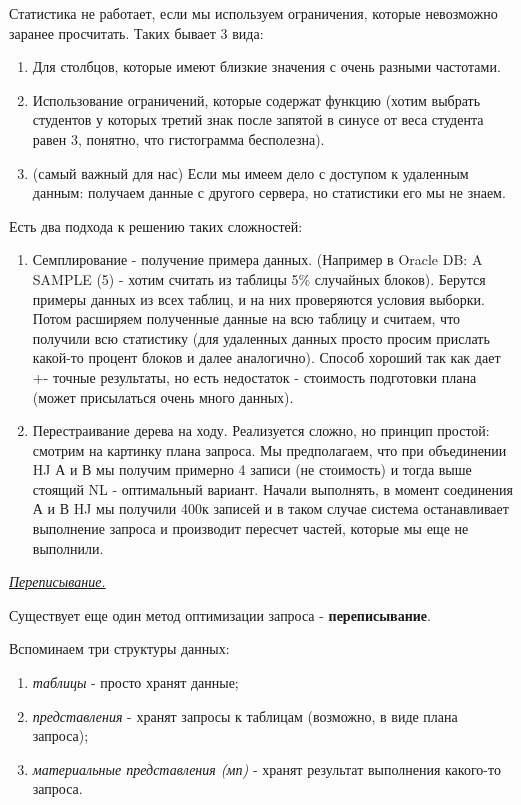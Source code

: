 \begin{itemize}
Статистика не работает, если мы используем ограничения, которые невозможно заранее просчитать. Таких бывает 3 вида: 
\begin{enumerate}
    \item Для столбцов, которые имеют близкие значения с очень разными частотами.
    \item Использование ограничений, которые содержат функцию (хотим выбрать студентов у которых третий знак после запятой в синусе от веса студента равен 3, понятно, что гистограмма бесполезна).
    \item (самый важный для нас) Если мы имеем дело с доступом к удаленным данным: получаем данные с другого сервера, но статистики его мы не знаем.
\end{enumerate}

Есть два подхода к решению таких сложностей: 

\begin{enumerate}
    \item Семплирование - получение примера данных. (Например в Oracle DB: A SAMPLE (5) - хотим считать из таблицы 5\% случайных блоков). Берутся примеры данных из всех таблиц, и на них проверяются условия выборки. Потом расширяем полученные данные на всю таблицу и считаем, что получили всю статистику (для удаленных данных просто просим прислать какой-то процент блоков и далее аналогично). Способ хороший так как дает +- точные результаты, но есть недостаток - стоимость подготовки плана (может присылаться очень много данных).
    \item Перестраивание дерева на ходу. Реализуется сложно, но принцип простой:  смотрим на картинку плана запроса. Мы предполагаем, что при объединении HJ А и В мы получим примерно 4 записи (не стоимость) и тогда выше стоящий NL - оптимальный вариант. Начали выполнять, в момент соединения А и В HJ мы получили 400к записей и в таком случае система останавливает выполнение запроса и производит пересчет частей, которые мы еще не выполнили.
\end{enumerate}
\end{itemize}


\begin{center}
\textit{\underline{Переписывание.}}
\end{center}

Существует еще один метод оптимизации запроса - \textbf{переписывание}. 

Вспоминаем три структуры данных: 

\begin{enumerate}
    \item \textit{таблицы} - просто хранят данные;
    \item  \textit{представления} - хранят запросы к таблицам (возможно, в виде плана запроса);
    \item \textit{материальные представления (мп)} - хранят результат выполнения какого-то запроса. 
\end{enumerate}

